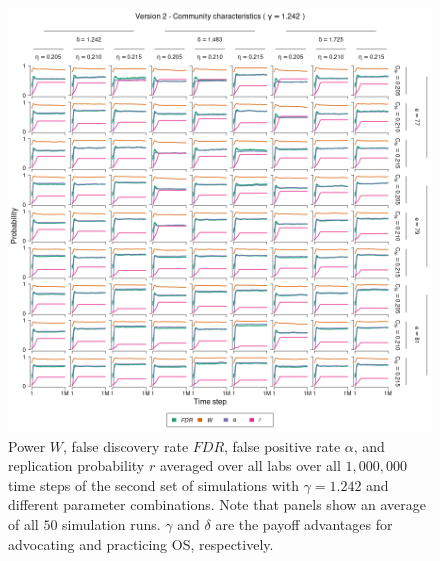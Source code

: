 \documentclass[meta, authordate,issue]{jote-new-article}
\begin{document}
\begin{figure}
  \begin{fullwidth}
    \centering
    \includegraphics[width=\textwidth]{v2_cha_plot_sens_payypro1.242.png}
    \caption{Power $W$, false discovery rate $FDR$, false positive rate $\alpha$, and replication probability $r$ averaged over all labs over all $1,000,000$ time steps of the second set of simulations with $\gamma=1.242$ and different parameter combinations. Note that panels show an average of all $50$ simulation runs. $\gamma$ and $\delta$ are the payoff advantages for advocating and practicing OS, respectively.}
    \label{fig:v2_cha_plot_sens_payypro1.242}
  \end{fullwidth}
\end{figure}
%
%
\end{document}
